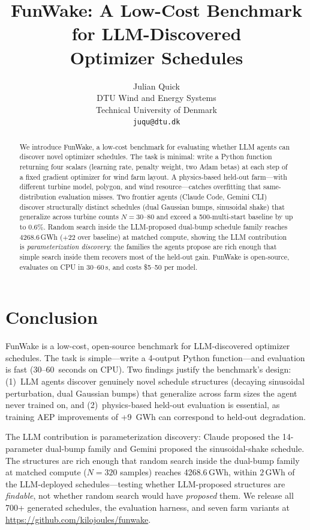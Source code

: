\documentclass{article}
\title{FunWake: A Low-Cost Benchmark for LLM-Discovered\\Optimizer Schedules}
\author{
  Julian Quick \\
  DTU Wind and Energy Systems \\
  Technical University of Denmark \\
  \texttt{juqu@dtu.dk}
}
\begin{document}
\maketitle

\begin{abstract}
We introduce FunWake, a low-cost benchmark for evaluating whether
LLM agents can discover novel optimizer schedules. The task is
minimal: write a Python function returning four scalars (learning
rate, penalty weight, two Adam betas) at each step of a fixed
gradient optimizer for wind farm layout. A physics-based held-out
farm---with different turbine model, polygon, and wind
resource---catches overfitting that same-distribution evaluation
misses. Two frontier agents (Claude Code, Gemini CLI) discover
structurally distinct schedules (dual Gaussian bumps, sinusoidal
shake) that generalize across turbine counts $N\!=\!30$--$80$ and
exceed a 500-multi-start baseline by up to 0.6\%. Random search
inside the LLM-proposed dual-bump schedule family reaches
4268.6\,GWh ($+22$ over baseline) at matched compute, showing
the LLM contribution is \emph{parameterization discovery}: the
families the agents propose are rich enough that simple search
inside them recovers most of the held-out gain. FunWake is
open-source, evaluates on CPU in 30--60\,s, and costs \$5--50
per model.
\end{abstract}








\section{Conclusion}
\label{sec:conclusion}

FunWake is a low-cost, open-source benchmark for LLM-discovered
optimizer schedules. The task is simple---write a 4-output Python
function---and evaluation is fast (30--60~seconds on CPU). Two findings
justify the benchmark's design: (1)~LLM agents discover genuinely novel
schedule structures (decaying sinusoidal perturbation, dual Gaussian
bumps) that generalize across farm sizes the agent never trained on, and
(2)~physics-based held-out evaluation is essential, as training AEP
improvements of +9~GWh can correspond to held-out degradation.

The LLM contribution is parameterization discovery: Claude
proposed the 14-parameter dual-bump family and Gemini proposed
the sinusoidal-shake schedule. The structures are rich enough that
random search inside the dual-bump family at matched compute
($N{=}320$ samples) reaches 4268.6\,GWh, within $2$\,GWh of the
LLM-deployed schedules---testing whether LLM-proposed structures
are \emph{findable}, not whether random search would have
\emph{proposed} them. We release all 700+ generated schedules,
the evaluation harness, and seven farm variants at
\url{https://github.com/kilojoules/funwake}.
\end{document}
